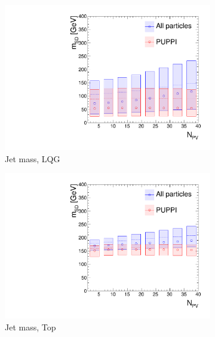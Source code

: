 \begin{figure}[]
    \begin{center}
        \begin{subfigure}[t]{0.35\textwidth}
            \includegraphics[width=\textwidth]{figures/toptagging/gen/npv_clf_MSD_QCD.pdf}
            \caption{Jet mass, LQG}
        \end{subfigure}
        \begin{subfigure}[t]{0.35\textwidth}
            \includegraphics[width=\textwidth]{figures/toptagging/gen/npv_clf_MSD_ZpTT_lo.pdf}
            \caption{Jet mass, Top}
        \end{subfigure}
        \begin{subfigure}[t]{0.35\textwidth}

\end{subfigure}
\end{center}
\end{figure}
